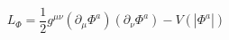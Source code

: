 \begin{equation}
L_{\Phi}=\frac{1}{2}g^{\mu\nu}(\partial_{\mu}\Phi^{a})(\partial_{\nu}\Phi^{a})-V(|\Phi^{a}|)
\end{equation}

